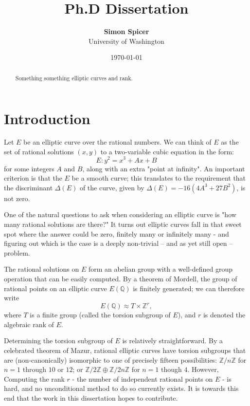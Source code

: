 \documentclass[10pt]{article}
\title{Ph.D Dissertation}
\author{{\bf Simon Spicer} \\ University of Washington}
\date{\today}
\begin{document}
\maketitle

\begin{abstract}
Something something elliptic curves and rank.
\end{abstract}

\newpage
\section{Introduction}

Let $E$ be an elliptic curve over the rational numbers. We can think of $E$ as the set of rational solutions $(x,y)$ to a two-variable cubic equation in the form:
\begin{equation}
E: y^2 = x^3 + Ax + B
\end{equation}
for some integers $A$ and $B$, along with an extra "point at infinity". An important criterion is that the $E$ be a smooth curve; this translates to the requirement that the discriminant $\Delta(E)$ of the curve, given by $\Delta(E) = -16(4A^3+27B^2)$, is not zero.

One of the natural questions to ask when considering an elliptic curve is "how many rational solutions are there?" It turns out elliptic curves fall in that sweet spot where the answer could be zero, finitely many or infinitely many - and figuring out which is the case is a deeply non-trivial -- and as yet still open -- problem.

The rational solutions on $E$ form an abelian group with a well-defined group operation that can be easily computed. By a theorem of Mordell, the group of rational points on an elliptic curve $E(\mathbb{Q})$ is finitely generated; we can therefore write
\begin{equation}
E(\mathbb{Q}) \approx T \times \mathbb{Z}^r,
\end{equation}
where $T$ is a finite group (called the torsion subgroup of $E$), and $r$ is denoted the algebraic rank of $E$.

Determining the torsion subgroup of $E$ is relatively straightforward. By a celebrated theorem of Mazur, rational elliptic curves have torsion subgroups that are (non-canonically) isomorphic to one of precisely fifteen possibilities: $\mathbb{Z}/n\mathbb{Z}$ for $n = 1$ through $10$ or $12$; or $\mathbb{Z}/2\mathbb{Z}\oplus \mathbb{Z}/2n\mathbb{Z}$ for $n = 1$ though $4$. However, Computing the rank $r$ - the number of independent rational points on $E$ - is hard, and no unconditional method to do so currently exists. It is towards this end that the work in this dissertation hopes to contribute. \\
\end{document}
